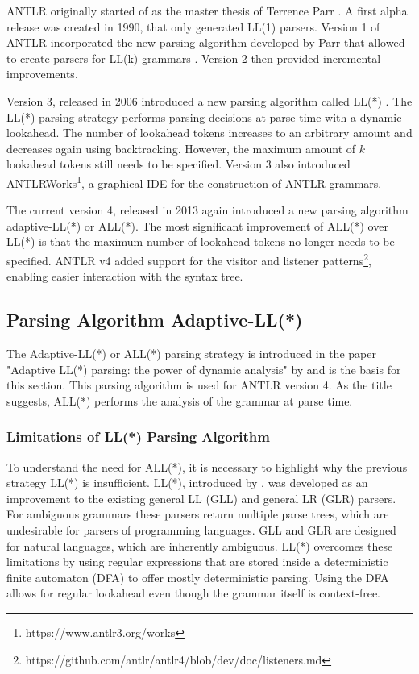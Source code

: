 ANTLR originally started of as the master thesis of Terrence Parr \parencite{PCCTSHistory1994}. A first alpha release was created in 1990, that only generated LL(1) parsers. Version 1 of ANTLR incorporated the new parsing algorithm developed by Parr that allowed to create parsers for LL(k) grammars \parencite{parrPhd1993}. Version 2 then provided incremental improvements.   

Version 3, released in 2006 introduced a new parsing algorithm called LL(*) \parencite{LLSParsing2011}. The LL(*) parsing strategy performs parsing decisions at parse-time with a dynamic lookahead. The number of lookahead tokens increases to an arbitrary amount and decreases again using backtracking. However, the maximum amount of $k$ lookahead tokens still needs to be specified. Version 3 also introduced ANTLRWorks\footnote{https://www.antlr3.org/works}, a graphical IDE for the construction of ANTLR grammars.

The current version 4, released in 2013 again introduced a new parsing algorithm adaptive-LL(*) or ALL(*). The most significant improvement of ALL(*) over LL(*) is that the maximum number of lookahead tokens no longer needs to be specified. ANTLR v4 added support for the visitor and listener patterns\footnote{https://github.com/antlr/antlr4/blob/dev/doc/listeners.md}, enabling easier interaction with the syntax tree. 

\subsection{Parsing Algorithm Adaptive-LL(*)}
\label{sec:allstar}

The Adaptive-LL(*) or ALL(*) parsing strategy is introduced in the paper "Adaptive LL(*) parsing: the power of dynamic analysis" by \textcite{ALLParsing2014} and is the basis for this section. This parsing algorithm is used  for ANTLR version 4. As the title suggests, ALL(*) performs the analysis of the grammar at parse time. 

\subsubsection{Limitations of LL(*) Parsing Algorithm}

To understand the need for ALL(*), it is necessary to highlight why the previous strategy LL(*) is insufficient. LL(*), introduced by \textcite{parr2011ll}, was developed as an improvement to the existing general LL (GLL) \parencite{GLL2010} and general LR (GLR) \parencite{tomita1991generalized} parsers. For ambiguous grammars these parsers return multiple parse trees, which are undesirable for parsers of programming languages. GLL and GLR are  designed for natural languages, which are inherently ambiguous. LL(*) overcomes these limitations by using regular expressions that are stored inside a deterministic finite automaton (DFA) to offer mostly deterministic parsing. Using the DFA allows for regular lookahead even though the grammar itself is context-free. 

